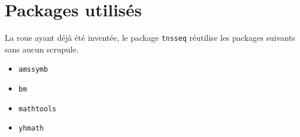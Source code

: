 \documentclass[12pt,a4paper]{article}
\begin{document}
\section{Packages utilisés}

La roue ayant déjà été inventée, le package \verb#tnsseq# réutilise les packages suivants sans aucun scrupule.

\begin{multicols}{4}
    \begin{itemize}
        \item \verb#amssymb#
        \item \verb#bm#
        \item \verb#mathtools#
        \item \verb#yhmath#
    \end{itemize}
\end{multicols}
\end{document}
